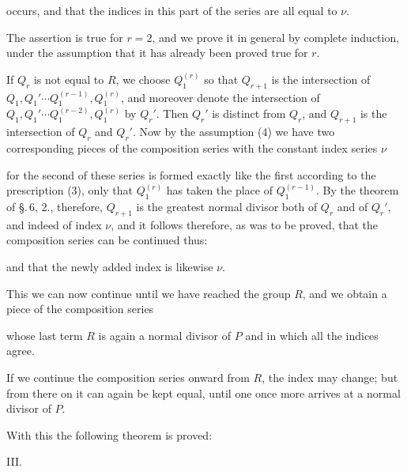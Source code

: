 
occurs, and that the indices in this part of the series are all
equal to $\nu$.

The assertion is true for $r = 2$, and we prove it in general
by complete induction, under the assumption that it has already
been proved true for $r$.

If $Q_r$ is not equal to $R$, we choose $Q_1^{(r)}$ so that $Q_{r+1}$ is the
intersection of $Q_1, Q_1' \cdots Q_1^{(r-1)}, Q_1^{(r)}$, and moreover denote
the intersection of $Q_1, Q_1' \cdots Q_1^{(r-2)}, Q_1^{(r)}$ by $Q_r'$. Then
$Q_r'$ is distinct from $Q_r$, and $Q_{r+1}$ is the intersection of
$Q_r$ and $Q_r'$. Now by the assumption (4) we have two
corresponding pieces of the composition series with the constant
index series $\nu$


for the second of these series is formed exactly like the first
according to the prescription (3), only that $Q_1^{(r)}$ has taken the
place of $Q_1^{(r-1)}$. By the theorem of \S.\,6, 2., therefore, $Q_{r+1}$ is
the greatest normal divisor both of $Q_r$ and of $Q_r'$, and indeed
of index $\nu$, and it follows therefore, as was to be proved, that
the composition series can be continued thus:


and that the newly added index is likewise $\nu$.

This we can now continue until we have reached the group $R$,
and we obtain a piece of the composition series


whose last term $R$ is again a normal divisor of $P$ and in
which all the indices agree.

If we continue the composition series onward from $R$, the
index may change; but from there on it can again be kept
equal, until one once more arrives at a normal divisor of $P$.

With this the following theorem is proved:

III.\ 


